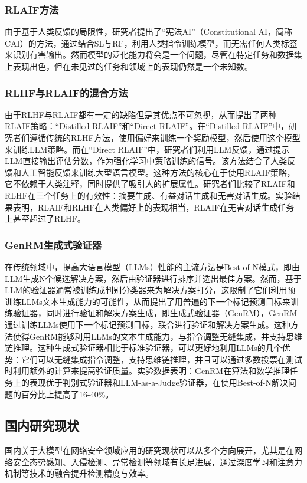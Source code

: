 \subsubsection{RLAIF方法}
由于基于人类反馈的局限性，研究者提出了“宪法AI”\cite{bai2022constitutional}（Constitutional AI，简称CAI）的方法，通过结合SL与RF，利用人类指令训练模型，而无需任何人类标签来识别有害输出。然而模型的泛化能力将会是一个问题，尽管在特定任务和数据集上表现出色，但在未见过的任务和领域上的表现仍然是一个未知数。
\subsubsection{RLHF与RLAIF的混合方法}
由于RLHF与RLAIF都有一定的缺陷但是其优点不可忽视，从而提出了两种RLAIF策略\cite{arXiv:2309.00267}：“Distilled RLAIF”和“Direct RLAIF”。在“Distilled RLAIF”中，研究者们遵循传统的RLHF方法，使用偏好来训练一个奖励模型，然后使用这个模型来训练LLM策略。而在“Direct RLAIF”中，研究者们利用LLM反馈，通过提示LLM直接输出评估分数，作为强化学习中策略训练的信号。该方法结合了人类反馈和人工智能反馈来训练大型语言模型。这种方法的核心在于使用RLAIF策略，它不依赖于人类注释，同时提供了吸引人的扩展属性。研究者们比较了RLAIF和RLHF在三个任务上的有效性：摘要生成、有益对话生成和无害对话生成。实验结果表明，RLAIF和RLHF在人类偏好上的表现相当，RLAIF在无害对话生成任务上甚至超过了RLHF。
\subsubsection{GenRM生成式验证器}
在传统领域中，提高大语言模型（LLMs）性能的主流方法是Best-of-N模式，即由LLM生成N个候选解决方案，然后由验证器进行排序并选出最佳方案。然而，基于LLM的验证器通常被训练成判别分类器来为解决方案打分，这限制了它们利用预训练LLMs文本生成能力的可能性，从而提出了用普遍的下一个标记预测目标来训练验证器，同时进行验证和解决方案生成，即生成式验证器\cite{zhang2024generative}（GenRM），GenRM通过训练LLMs使用下一个标记预测目标，联合进行验证和解决方案生成。这种方法使得GenRM能够利用LLMs的文本生成能力，与指令调整无缝集成，并支持思维链推理。这种生成式验证器相比于标准验证器，可以更好地利用LLMs的几个优势：它们可以无缝集成指令调整，支持思维链推理，并且可以通过多数投票在测试时利用额外的计算来提高验证质量。实验数据表明：GenRM在算法和数学推理任务上的表现优于判别式验证器和LLM-as-a-Judge验证器，在使用Best-of-N解决问题的百分比上提高了16-40\%。
\subsection{国内研究现状}
国内关于大模型在网络安全领域应用的研究现状可以从多个方向展开，尤其是在网络安全态势感知、入侵检测、异常检测等领域有长足进展，通过深度学习和注意力机制等技术的融合提升检测精度与效率。
